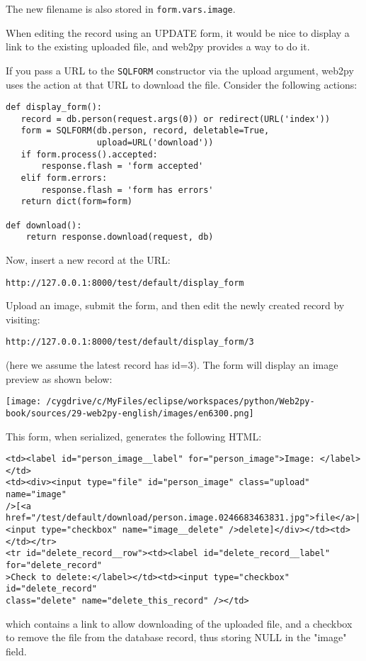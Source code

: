 \documentclass[justified,sixbynine,notoc]{tufte-book}
\def\ft{\small\tt}
\begin{document}
\begin{fullwidth}
The new filename is also stored in {\ft form.vars.image}.

When editing the record using an UPDATE form, it would be nice to display a link to the existing uploaded file, and web2py provides a way to do it.

If you pass a URL to the {\ft SQLFORM} constructor via the upload argument, web2py uses the action at that URL to download the file. Consider the following actions:
\begin{lstlisting}
def display_form():
   record = db.person(request.args(0)) or redirect(URL('index'))
   form = SQLFORM(db.person, record, deletable=True,
                  upload=URL('download'))
   if form.process().accepted:
       response.flash = 'form accepted'
   elif form.errors:
       response.flash = 'form has errors'
   return dict(form=form)

def download():
    return response.download(request, db)
\end{lstlisting}

Now, insert a new record at the URL:
\begin{lstlisting}[keywords={}]
http://127.0.0.1:8000/test/default/display_form
\end{lstlisting}

Upload an image, submit the form, and then edit the newly created record
by visiting:
\begin{lstlisting}[keywords={}]
http://127.0.0.1:8000/test/default/display_form/3
\end{lstlisting}

(here we assume the latest record has id=3). The form will display an image preview as shown below:


\goodbreak\begin{center}\texttt{[image: /cygdrive/c/MyFiles/eclipse/workspaces/python/Web2py-book/sources/29-web2py-english/images/en6300.png]}\end{center}


This form, when serialized, generates the following HTML:
\begin{lstlisting}[keywords={}]
<td><label id="person_image__label" for="person_image">Image: </label></td>
<td><div><input type="file" id="person_image" class="upload" name="image"
/>[<a href="/test/default/download/person.image.0246683463831.jpg">file</a>|
<input type="checkbox" name="image__delete" />delete]</div></td><td></td></tr>
<tr id="delete_record__row"><td><label id="delete_record__label" for="delete_record"
>Check to delete:</label></td><td><input type="checkbox" id="delete_record"
class="delete" name="delete_this_record" /></td>
\end{lstlisting}
\noindent which contains a link to allow downloading of the uploaded file, and a checkbox to remove the file from the database record, thus storing NULL in the "image" field.


\end{fullwidth}
\end{document}
